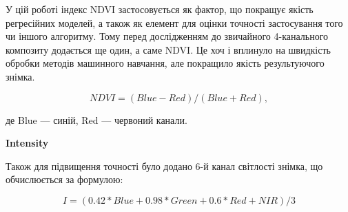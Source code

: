 У цій роботі індекс NDVI застосовується як фактор, що покращує якість
регресійних моделей, а також як елемент для оцінки точності застосування того
чи іншого алгоритму. Тому перед дослідженням до звичайного 4-канального
композиту додається ще один, а саме NDVI. Це хоч і вплинуло на швидкість
обробки методів машинного навчання, але покращило якість результуючого
знімка.

\begin{equation}
	NDVI = (Blue - Red)/(Blue + Red),
\end{equation}

де Blue --- синій, Red --- червоний
канали.

\textbf{Intensity}

Також для підвищення точності було додано 6-й канал світлості знімка,
що обчислюється за формулою:

\begin{equation}
	I = (0.42*Blue + 0.98*Green + 0.6*Red + NIR)/3
\end{equation}
